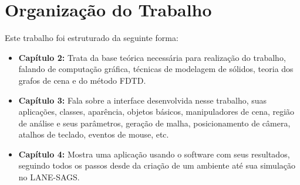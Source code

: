 \section{Organização do Trabalho}
Este trabalho foi estruturado da seguinte forma:
\begin{itemize}
\item \textbf{Capítulo 2:} Trata da base teórica necessária para realização do trabalho, falando de computação gráfica, técnicas de modelagem de sólidos, teoria dos grafos de cena e do método FDTD.
\item \textbf{Capítulo 3:} Fala sobre a interface desenvolvida nesse trabalho, suas aplicações, classes, aparência, objetos básicos, manipuladores de cena, região de análise e seus parâmetros, geração de malha, posicionamento de câmera, atalhos de teclado, eventos de mouse, etc. 
\item \textbf{Capítulo 4:} Mostra uma aplicação usando o software com seus resultados, seguindo todos os 
passos desde da criação de um ambiente até sua simulação no LANE-SAGS.
\end{itemize}
